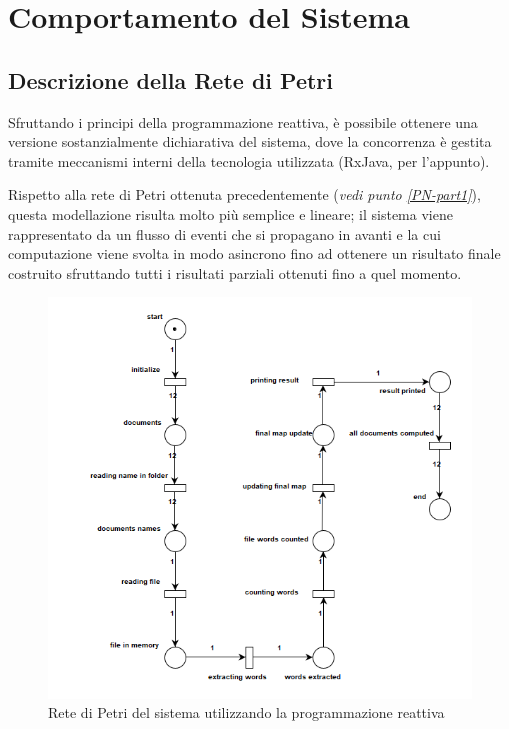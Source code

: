 \section{Comportamento del Sistema}

\subsection{Descrizione della Rete di Petri}
Sfruttando i principi della programmazione reattiva, è possibile ottenere una versione sostanzialmente dichiarativa del sistema, dove la concorrenza è gestita tramite meccanismi interni della tecnologia utilizzata (RxJava, per l'appunto).\newline

\noindent Rispetto alla rete di Petri ottenuta precedentemente (\textit{vedi punto \ref{PN-part1}}), questa modellazione risulta molto più semplice e lineare; il sistema viene rappresentato da un flusso di eventi che si propagano in avanti e la cui computazione viene svolta in modo asincrono fino ad ottenere un risultato finale costruito sfruttando tutti i risultati parziali ottenuti fino a quel momento.\newline

\begin{figure}[H]
    \caption{Rete di Petri del sistema utilizzando la programmazione reattiva}
    \centering
    \includegraphics[width=120mm]{img/Petri net - Reactive Programming.png}
\end{figure}

